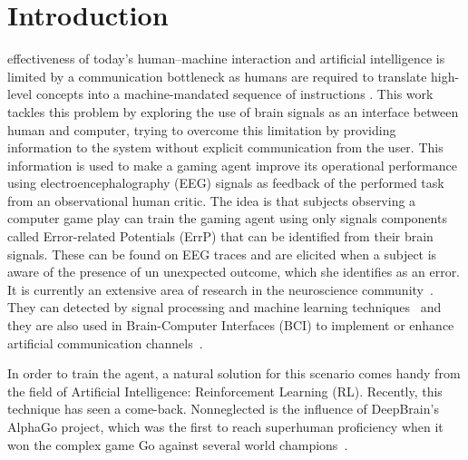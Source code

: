 \documentclass[journal]{IEEEtran}
\begin{document}
\section{Introduction}


 effectiveness of today's human–machine interaction and artificial intelligence is limited by a communication bottleneck as humans are required to translate high-level concepts into a machine-mandated sequence of instructions \cite{CURSOR-CONTROL-PAPER}.   This work tackles this problem by exploring the use of brain signals as an interface between human and computer, trying to overcome this limitation by providing information to the system without explicit communication from the user.  This information is used to make a gaming agent improve its operational performance using electroencephalography (EEG) signals as feedback of the performed task from an observational human critic. The idea is that subjects observing a computer game play can train the gaming agent using only signals components called Error-related Potentials (ErrP) that can be identified from their brain signals.   These can be found on EEG traces and are elicited when a subject is aware of the presence of un unexpected outcome, which she identifies as an error.  It is currently an extensive area of research in the neuroscience community~\cite{Holroyd2009}.  They can detected by signal processing and machine learning techniques~\cite{EERP-PAPER} and they are also used in Brain-Computer Interfaces (BCI) to implement or enhance artificial communication channels~\cite{Chavarriaga2014}.

In order to train the agent, a natural solution for this scenario comes handy from the field of Artificial Intelligence: Reinforcement Learning (RL). Recently, this technique has seen a come-back. Nonneglected is the influence of DeepBrain's AlphaGo project, which was the first to reach superhuman proficiency when it won the complex game Go against several world champions~\cite{ALPHA-GO}.

\end{document}
